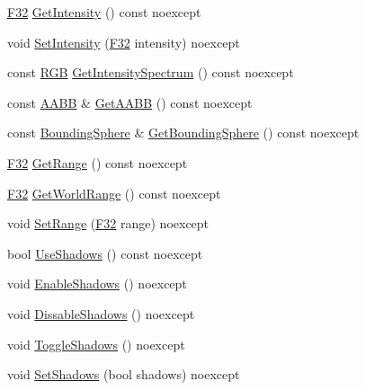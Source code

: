 \begin{DoxyCompactItemize}
\item 
\hyperlink{namespacemage_aa97e833b45f06d60a0a9c4fc22ae02c0}{F32} \hyperlink{classmage_1_1rendering_1_1_omni_light_ada51f74cdcf61ff29049d0a1fdf973c9}{Get\+Intensity} () const noexcept
\item 
void \hyperlink{classmage_1_1rendering_1_1_omni_light_aa2a936678bde1f957fd70207d2460d06}{Set\+Intensity} (\hyperlink{namespacemage_aa97e833b45f06d60a0a9c4fc22ae02c0}{F32} intensity) noexcept
\item 
const \hyperlink{structmage_1_1_r_g_b}{R\+GB} \hyperlink{classmage_1_1rendering_1_1_omni_light_a62247b6d7c2029ab906492049e858538}{Get\+Intensity\+Spectrum} () const noexcept
\item 
const \hyperlink{classmage_1_1_a_a_b_b}{A\+A\+BB} \& \hyperlink{classmage_1_1rendering_1_1_omni_light_aa3408de0d62c39d09e0b5aaccf61406a}{Get\+A\+A\+BB} () const noexcept
\item 
const \hyperlink{classmage_1_1_bounding_sphere}{Bounding\+Sphere} \& \hyperlink{classmage_1_1rendering_1_1_omni_light_aaecee74a14aae5015f8bc738727162ee}{Get\+Bounding\+Sphere} () const noexcept
\item 
\hyperlink{namespacemage_aa97e833b45f06d60a0a9c4fc22ae02c0}{F32} \hyperlink{classmage_1_1rendering_1_1_omni_light_af9bfc4b943b156756cd7c2323d93ebdd}{Get\+Range} () const noexcept
\item 
\hyperlink{namespacemage_aa97e833b45f06d60a0a9c4fc22ae02c0}{F32} \hyperlink{classmage_1_1rendering_1_1_omni_light_a7be27af3b3e5d11806396ce8f619223f}{Get\+World\+Range} () const noexcept
\item 
void \hyperlink{classmage_1_1rendering_1_1_omni_light_a71d9cbef05c421a154b202e7a9b8eedb}{Set\+Range} (\hyperlink{namespacemage_aa97e833b45f06d60a0a9c4fc22ae02c0}{F32} range) noexcept
\item 
bool \hyperlink{classmage_1_1rendering_1_1_omni_light_a7b4bd4cdd980feb3d841fff5947720e9}{Use\+Shadows} () const noexcept
\item 
void \hyperlink{classmage_1_1rendering_1_1_omni_light_a676a457b4e79b7dc74696acc713a9230}{Enable\+Shadows} () noexcept
\item 
void \hyperlink{classmage_1_1rendering_1_1_omni_light_a18eaf3b2683997854827b12ec26c9039}{Dissable\+Shadows} () noexcept
\item 
void \hyperlink{classmage_1_1rendering_1_1_omni_light_aa1816fad8913711c10994b66103279a2}{Toggle\+Shadows} () noexcept
\item 
void \hyperlink{classmage_1_1rendering_1_1_omni_light_a2817ab7a4c514785f01bf2e40c6245cb}{Set\+Shadows} (bool shadows) noexcept

\end{DoxyCompactItemize}
